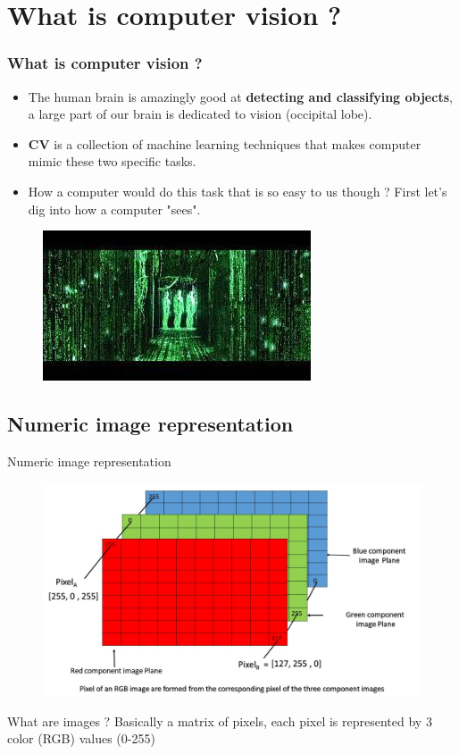 \documentclass[tikz,table,border=2mm]{beamer}
\begin{document}
\section{What is computer vision ?}
\begin{frame}
\frametitle{What is computer vision ?}
\begin{itemize}
	\item The human brain is amazingly good at \textbf{detecting and classifying objects}, a large part of our brain is dedicated to vision (occipital lobe).
	\item \textbf{CV} is a collection of machine learning techniques that makes computer mimic these two specific tasks.
	\item How a computer would do this task that is so easy to us though ? First let's dig into how a computer "sees".
\end{itemize}
    \begin{figure}
    \includegraphics[width=0.6\linewidth]{images/matrix.jpeg}
    \end{figure}
\end{frame}


\subsection{Numeric image representation}


\begin{frame}{Numeric image representation}
    \begin{figure}
    \includegraphics[width=0.8\linewidth]{images/pixel.jpg}
    \end{figure}
    
    \begin{block}{What are images ?}
        Basically a matrix of pixels, each pixel is represented by 3 color (RGB) values (0-255)
    \end{block}


\end{frame}
\end{document}
